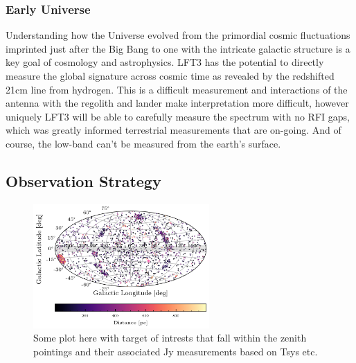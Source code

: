\subsubsection{Early Universe}
Understanding how the Universe evolved from the primordial cosmic fluctuations imprinted just after the Big Bang  to one with the intricate galactic structure is a key goal of cosmology and astrophysics.  LFT3 has the potential to directly measure the global signature across cosmic time as revealed by the redshifted 21cm line from hydrogen.  This is a difficult measurement and interactions of the antenna with the regolith and lander make interpretation more difficult, however uniquely LFT3 will be able to carefully measure the spectrum with no RFI gaps, which was greatly informed terrestrial measurements that are on-going.  And of course, the low-band can't be measured from the earth's surface.


\subsection{Observation Strategy} %

\begin{figure}[h]
    \centering
    \includegraphics[width=0.6\textwidth]{figures/Science Case Plots/galactic_projection_NEA.png}
    \caption{Some plot here with target of intrests that fall within the zenith pointings and their associated Jy measurements based on Tsys etc. }
    \label{fig:enter-label}
\end{figure}